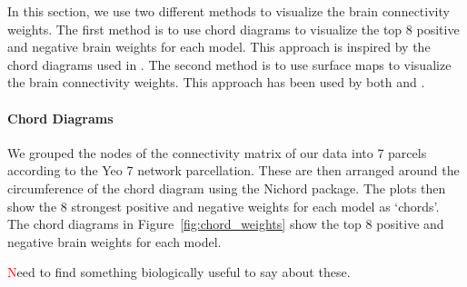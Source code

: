In this section, we use two different methods to visualize the brain connectivity weights.
The first method is to use chord diagrams to visualize the top 8 positive and negative brain \gls{weights} for each model.
This approach is inspired by the chord diagrams used in \cite{smith2015positive}.
The second method is to use surface maps to visualize the brain connectivity weights.
This approach has been used by both \cite{ferreira2022hierarchical} and \cite{smith2015positive}.

\paragraph{Chord Diagrams}
We grouped the nodes of the connectivity matrix of our data into 7 parcels according to the Yeo 7 network parcellation\cite{yeo2011organization}.
These are then arranged around the circumference of the chord diagram using the Nichord package\cite{bogdan2023connsearch}.
The plots then show the 8 strongest positive and negative \gls{weights} for each model as `chords'.
The chord diagrams in Figure~\ref{fig:chord_weights} show the top 8 positive and negative brain \gls{weights} for each model.

\textcolor{red} Need to find something biologically useful to say about these.

